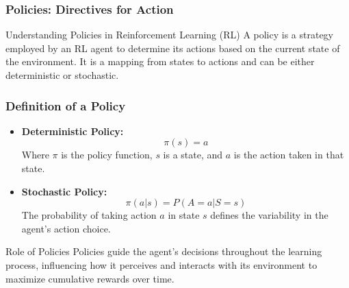 \documentclass{beamer}
\begin{document}
\begin{frame}[fragile]
    \frametitle{Policies: Directives for Action}
    
    \begin{block}{Understanding Policies in Reinforcement Learning (RL)}
        A policy is a strategy employed by an RL agent to determine its actions based on the current state of the environment. It is a mapping from states to actions and can be either deterministic or stochastic.
    \end{block}
\end{frame}

\begin{frame}[fragile]
    \frametitle{Definition of a Policy}

    \begin{itemize}
        \item \textbf{Deterministic Policy:}
        \[
        \pi(s) = a
        \]
        Where \( \pi \) is the policy function, \( s \) is a state, and \( a \) is the action taken in that state.
        
        \item \textbf{Stochastic Policy:}
        \[
        \pi(a|s) = P(A=a | S=s)
        \]
        The probability of taking action \( a \) in state \( s \) defines the variability in the agent's action choice.
    \end{itemize}
    
    \begin{block}{Role of Policies}
        Policies guide the agent's decisions throughout the learning process, influencing how it perceives and interacts with its environment to maximize cumulative rewards over time.
    \end{block}
\end{frame}
\end{document}
